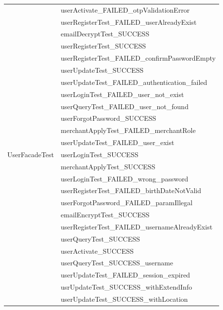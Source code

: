 \documentclass[a4paper]{article}
\begin{document}
\begin{enumerate}
\begin{longtable}[c]{|l|l|}
\multirow{25}{*}{UserFacadeTest} & userActivate\_FAILED\_otpValidationError \\ \cline{2-2} 
 & userRegisterTest\_FAILED\_userAlreadyExist \\ \cline{2-2} 
 & emailDecryptTest\_SUCCESS \\ \cline{2-2} 
 & userRegisterTest\_SUCCESS \\ \cline{2-2} 
 & userRegisterTest\_FAILED\_confirmPasswordEmpty \\ \cline{2-2} 
 & userUpdateTest\_SUCCESS \\ \cline{2-2} 
 & userUpdateTest\_FAILED\_authentication\_failed \\ \cline{2-2} 
 & userLoginTest\_FAILED\_user\_not\_exist \\ \cline{2-2} 
 & userQueryTest\_FAILED\_user\_not\_found \\ \cline{2-2} 
 & userForgotPassword\_SUCCESS \\ \cline{2-2} 
 & merchantApplyTest\_FAILED\_merchantRole \\ \cline{2-2} 
 & userUpdateTest\_FAILED\_user\_exist \\ \cline{2-2} 
 & userLoginTest\_SUCCESS \\ \cline{2-2} 
 & merchantApplyTest\_SUCCESS \\ \cline{2-2} 
 & userLoginTest\_FAILED\_wrong\_password \\ \cline{2-2} 
 & userRegisterTest\_FAILED\_birthDateNotValid \\ \cline{2-2} 
 & userForgotPassword\_FAILED\_paramIllegal \\ \cline{2-2} 
 & emailEncryptTest\_SUCCESS \\ \cline{2-2} 
 & userRegisterTest\_FAILED\_usernameAlreadyExist \\ \cline{2-2} 
 & userQueryTest\_SUCCESS \\ \cline{2-2} 
 & userActivate\_SUCCESS \\ \cline{2-2} 
 & userQueryTest\_SUCCESS\_username \\ \cline{2-2} 
 & userUpdateTest\_FAILED\_session\_expired \\ \cline{2-2} 
 & usrUpdateTest\_SUCCESS\_withExtendInfo \\ \cline{2-2} 
 & userUpdateTest\_SUCCESS\_withLocation \\ \hline
\end{longtable}

\end{enumerate}

\newpage
\end{document}
